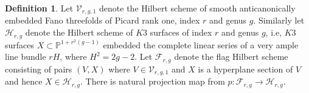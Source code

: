 \documentclass[11pt,twoside]{amsart}
\theoremstyle{plain}
\numberwithin{equation}{section}
\newtheorem{proposition}[theorem]{Proposition}
\theoremstyle{definition}
\newtheorem{definition}[theorem]{Definition}
\begin{document}


\begin{definition}\label{Hilbert scheme of Fanos and K3}
    Let $\mathcal{V}_{r,g,1}$ denote the Hilbert scheme of smooth anticanonically embedded Fano threefolds of Picard rank one, index $r$ and genus $g$. Similarly let $\mathcal{H}_{r,g}$ denote the Hilbert scheme of $K3$ surfaces of index $r$ and genus $g$, i.e, $K3$ surfaces $X \subset \mathbb{P}^{1+r^2(g-1)}$ embedded the complete linear series of a very ample line bundle $rH$, where $H^2 = 2g-2$. Let $\mathcal{F}_{r,g}$ denote the flag Hilbert scheme consisting of pairs $(V,X)$ where $V \in \mathcal{V}_{r,g,1}$ and $X$ is a hyperplane section of $V$ and hence $X \in \mathcal{H}_{r,g}$. There is natural projection map from $p: \mathcal{F}_{r,g} \to \mathcal{H}_{r,g}$.
\end{definition}
\end{document}
